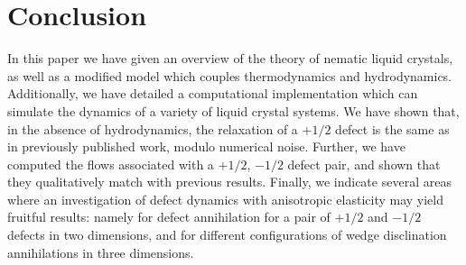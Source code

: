 \documentclass[reqno]{article}
\begin{document}
  \section{Conclusion}
  In this paper we have given an overview of the theory of nematic liquid
  crystals, as well as a modified model which couples thermodynamics and
  hydrodynamics. 
  Additionally, we have detailed a computational implementation which can
  simulate the dynamics of a variety of liquid crystal systems.
  We have shown that, in the absence of hydrodynamics, the relaxation of a
  $+1/2$ defect is the same as in previously published work, modulo numerical
  noise.
  Further, we have computed the flows associated with a $+1/2$, $-1/2$ defect
  pair, and shown that they qualitatively match with previous results.
  Finally, we indicate several areas where an investigation of defect dynamics
  with anisotropic elasticity may yield fruitful results: namely for defect
  annihilation for a pair of $+1/2$ and $-1/2$ defects in two dimensions, and
  for different configurations of wedge disclination annihilations in three
  dimensions. 
  
\end{document}
